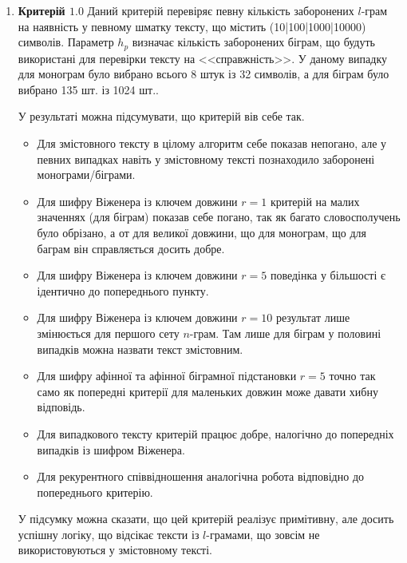 \begin{enumerate}
    \item \textbf{Критерій $1.0$}
        Даний критерій перевіряє певну кількість заборонених $l$-грам на наявність у певному шматку тексту, що містить (10|100|1000|10000) символів. Параметр $h_p$ визначає кількість заборонених біграм, що будуть використані для перевірки тексту на <<справжність>>. У даному випадку для монограм було вибрано всього 8 штук із 32 символів, а для біграм було вибрано 135 шт. із 1024 шт..

        У результаті можна підсумувати, що критерій вів себе так.
        \begin{itemize}
            \item Для змістовного тексту в цілому алгоритм себе показав непогано, але у певних випадках навіть у змістовному тексті познаходило заборонені монограми/біграми. 
            \item Для шифру Віженера із ключем довжини $r=1$ критерій на малих значеннях (для біграм) показав себе погано, так як багато словосполучень було обрізано, а от для великої довжини, що для монограм, що для баграм він справляється досить добре. 
            \item Для шифру Віженера із ключем довжини $r=5$ поведінка у більшості є ідентично до попереднього пункту.
            \item Для шифру Віженера із ключем довжини $r=10$ результат лише змінюється для першого сету $n$-грам. Там лише для біграм у половині випадків можна назвати текст змістовним. 
            \item Для шифру афінної та афінної біграмної підстановки $r=5$ точно так само як попередні критерії для маленьких довжин може давати хибну відповідь.
            \item Для випадкового тексту критерій працює добре, налогічно до попередніх випадків із шифром Віженера.
            \item Для рекурентного співвідношення аналогічна робота відповідно до попереднього критерію.
        \end{itemize}

        У підсумку можна сказати, що цей критерій реалізує примітивну, але досить успішну логіку, що відсікає тексти із $l$-грамами, що зовсім не використовуються у змістовному тексті.


\end{enumerate}
